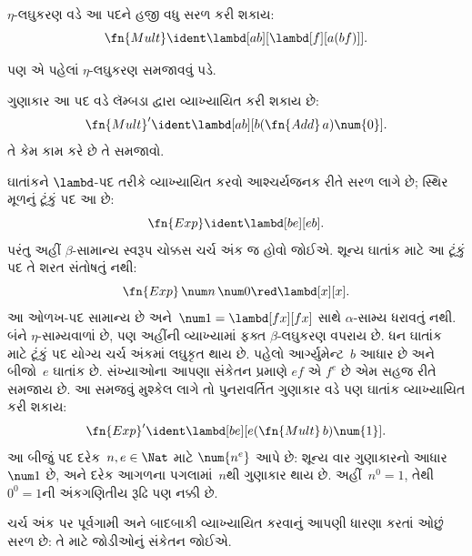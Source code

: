 \begin{editorial}
$\eta$-લઘુકરણ વડે આ પદને હજી વધુ સરળ કરી શકાય:
\[
  \fn{Mult} \ident \lambd[ab][\lambd[f][a (b f)]].
\]

પણ એ પહેલાં $\eta$-લઘુકરણ સમજાવવું પડે.
\end{editorial}

\begin{prob}
ગુણાકાર આ પદ વડે લૅમ્બડા દ્વારા વ્યાખ્યાયિત કરી શકાય છે:
\[
  \fn{Mult}' \ident \lambd[ab][b (\fn{Add}\, a) \num{0}].
\]
તે કેમ કામ કરે છે તે સમજાવો.
\end{prob}

ઘાતાંકને $\lambd$-પદ તરીકે વ્યાખ્યાયિત કરવો
આશ્ચર્યજનક રીતે સરળ લાગે છે; સ્થિર મૂળનું ટૂંકું પદ આ છે:
\[
\fn{Exp} \ident \lambd[be][e b].
\]
પરંતુ અહીં $\beta$-સામાન્ય સ્વરૂપ ચોક્કસ ચર્ચ અંક જ
હોવો જોઈએ. શૂન્ય ઘાતાંક માટે આ ટૂંકું પદ તે શરત સંતોષતું નથી:
\[
\fn{Exp}\,\num n\,\num0\red\lambd[x][x].
\]
આ ઓળખ-પદ સામાન્ય છે અને~$\num1=\lambd[fx][fx]$ સાથે
$\alpha$-સામ્ય ધરાવતું નથી. બંને $\eta$-સામ્યવાળાં છે,
પણ અહીંની વ્યાખ્યામાં ફક્ત $\beta$-લઘુકરણ વપરાય છે.
ધન ઘાતાંક માટે ટૂંકું પદ યોગ્ય ચર્ચ અંકમાં લઘુકૃત થાય છે.
પહેલો આર્ગ્યુમેન્ટ~$b$ આધાર છે અને બીજો~$e$
ઘાતાંક છે. સંખ્યાઓના આપણા સંકેતન પ્રમાણે
$e f$ એ $f^e$ છે એમ સહજ રીતે સમજાય છે.
આ સમજવું મુશ્કેલ લાગે તો પુનરાવર્તિત ગુણાકાર
વડે પણ ઘાતાંક વ્યાખ્યાયિત કરી શકાય:
\[
  \fn{Exp}' \ident \lambd[be][e (\fn{Mult}\, b) \num{1}].
\]
આ બીજું પદ દરેક~$n,e\in\Nat$ માટે
$\num{n^e}$ આપે છે: શૂન્ય વાર ગુણાકારનો આધાર~$\num1$ છે,
અને દરેક આગળના પગલામાં~$n$થી ગુણાકાર થાય છે.
અહીં~$n^0=1$, તેથી~$0^0=1$ની અંકગણિતીય રૂઢિ પણ નક્કી છે.

ચર્ચ અંક પર પૂર્વગામી અને બાદબાકી વ્યાખ્યાયિત
કરવાનું આપણી ધારણા કરતાં ઓછું સરળ છે:
તે માટે જોડીઓનું સંકેતન જોઈએ.
\endgroup

\begingroup
\makeatletter{}\makeatother

\label{guunit:OLP-0376}


